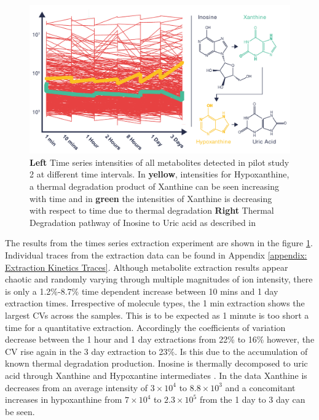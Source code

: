 \documentclass[a4paper]{book}
\begin{document}
	\begin{figure}[ht]
		\includegraphics[width=\linewidth]{2.Optimizaiton_Figures/Extraction_Details.pdf}
		\caption{\textbf{Left} Time series intensities of all metabolites detected in pilot study 2 at different time intervals. In \textbf{yellow}, intensities for Hypoxanthine, a thermal degradation product of Xanthine can be seen increasing with time and in \textbf{green} the intensities of Xanthine is decreasing with respect to time due to thermal degradation  \textbf{Right} Thermal Degradation pathway of Inosine to Uric acid as described in \citep{FangThermalInvestigation}  }
		\label{fig:Pilot Study 2 - Extraction Time Series}
	\end{figure}
	
	The results from the times series extraction experiment are shown in the figure \ref{fig:Pilot Study 2 - Extraction Time Series}. Individual traces from the extraction data can be found in Appendix \ref{appendix: Extraction Kinetics Traces}. Although metabolite extraction results appear chaotic and randomly varying through multiple magnitudes of ion intensity, there is only a 1.2\%-8.7\% time dependent increase between 10 mins and 1 day extraction times. Irrespective of molecule types, the 1 min extraction shows the largest CVs across the samples. This is to be expected as 1 minute is too short a time for a quantitative extraction. Accordingly the coefficients of variation decrease between the 1 hour and 1 day extractions from 22\% to 16\% however, the CV rise again in the 3 day extraction to 23\%. Is this due to the accumulation of known thermal degradation production. Inosine is thermally decomposed to uric acid through Xanthine and Hypoxantine intermediates \citep{FangThermalInvestigation}. In the data Xanthine is decreases from an average intensity of $3\times10^4$ to $8.8\times10^3$ and a concomitant increases in hypoxanthine from $7\times10^4$ to $2.3\times10^5$ from the 1 day to 3 day can be seen.
	
\end{document}
